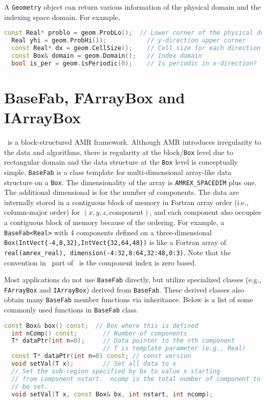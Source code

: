 A {\tt Geometry} object can return various information of the physical
domain and the indexing space domain.  For example,
\begin{lstlisting}[language=cpp]
  const Real* problo = geom.ProbLo();  // Lower corner of the physical domain
  Real yhi = geom.ProbHi(1);           // y-direction upper corner
  const Real* dx = geom.CellSize();    // Cell size for each direction
  const Box& domain = geom.Domain();   // Index domain
  bool is_per = geom.isPeriodic(0);    // Is periodic in x-direction?
\end{lstlisting}


\section{BaseFab, FArrayBox and IArrayBox}

\amrex\ is a block-structured AMR framework.  Although AMR introduces
irregularity to the data and algorithms, there is regularity at the
block/{\tt Box} level due to rectangular domain and the data structure
at the {\tt Box} level is conceptually simple.  {\tt BaseFab} is a
class template for multi-dimensional array-like data structure on a
{\tt Box}.  The dimensionality of the array is {\tt AMREX\_SPACEDIM}
plus one.  The additional dimensional is for the number of components.
The data are internally stored in a contiguous block of memory in
Fortran array order (i.e., column-major order) for
$(x,y,z,\mathrm{component})$, and each component also occupies a
contiguous block of memory because of the ordering.  For example, a
{\tt BaseFab<Real>} with 4 components defined on a three-dimensional
{\tt Box(IntVect\{-4,8,32\},IntVect\{32,64,48\})} is like a Fortran
array of {\tt real(amrex\_real), dimension(-4:32,8:64,32:48,0:3)}.
Note that the convention in \cpp\ part of \amrex\ is the component
index is zero based.

Most applications do not use {\tt BaseFab} directly, but utilize
specialized classes (e.g., {\tt FArrayBox} and {\tt IArrayBox})
derived from {\tt BaseFab}.  These derived classes also obtain many
{\tt BaseFab} member functions via inheritance.  Below is a list of
some commonly used functions in {\tt BaseFab} class.
\begin{lstlisting}[language=cpp]
  const Box& box() const;  // Box where this is defined
  int nComp() const;       // Number of components
  T* dataPtr(int n=0);     // Data pointer to the nth component
                           // T is template parameter (e.g., Real)
  const T* dataPtr(int n=0) const; // const version
  void setVal(T x);        // Set all data to x
  // Set the sub-region specified by bx to value x starting
  // from component nstart.  ncomp is the total number of component to
  // be set.
  void setVal(T x, const Box& bx, int nstart, int ncomp);
\end{lstlisting}


